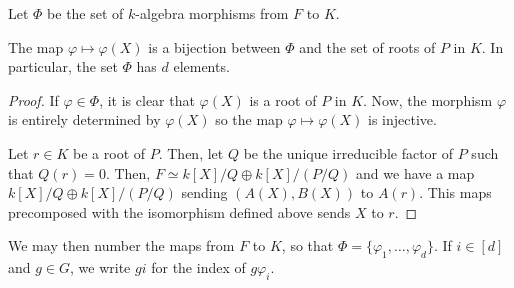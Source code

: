 Let \(\Phi\) be the set of \(k\)-algebra morphisms from \(F\) to \(K\).
\begin{lemma}\label{lemma:BrauerAdamson}
     The map \(\varphi \mapsto \varphi(X)\) is a bijection between \(\Phi\) and the set of roots of \(P\) in \(K\). In particular, the set \(\Phi\) has \(d\) elements.
\end{lemma}

\begin{proof}
    If \(\varphi \in \Phi\), it is clear that \(\varphi(X)\) is a root of \(P\) in \(K\). Now, the morphism \(\varphi\) is entirely determined by \(\varphi(X)\) so the map \(\varphi \mapsto \varphi(X)\) is injective.

    Let \(r \in K\) be a root of \(P\). Then, let \(Q\) be the unique irreducible factor of \(P\) such that \(Q(r) = 0\). Then, \(F \simeq k[X]/Q \oplus k[X]/(P/Q)\) and we have a map \(k[X]/Q \oplus k[X]/(P/Q)\) sending \((A(X),B(X))\) to \(A(r)\). This maps precomposed with the isomorphism defined above sends \(X\) to \(r\).
\end{proof}

We may then number the maps from \(F\) to \(K\), so that \(\Phi = \{\varphi_1,\hdots,\varphi_d\}\). If \(i \in [d]\) and \(g \in G\), we write \(gi\) for the index of \(g \varphi_i\).

